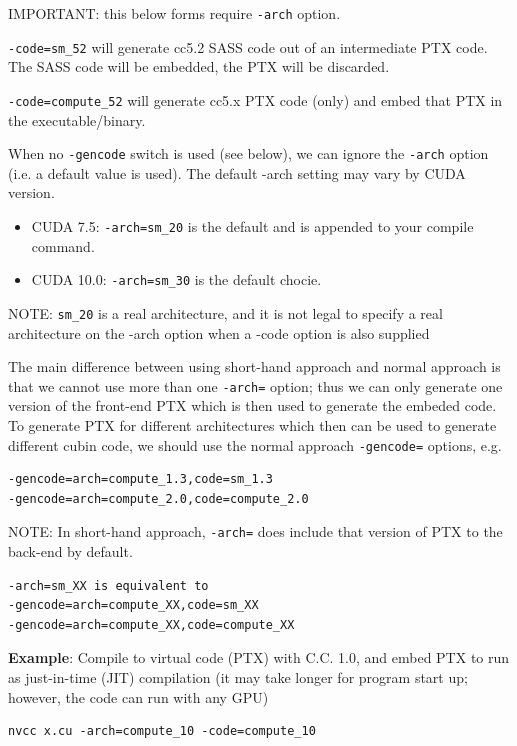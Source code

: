\begin{mdframed}
IMPORTANT: this below forms require \verb!-arch! option.

\verb!-code=sm_52! will generate cc5.2 SASS code out of an intermediate PTX
code. The SASS code will be embedded, the PTX will be discarded.

\verb!-code=compute_52! will generate cc5.x PTX code (only) and embed that PTX
in the executable/binary. 


When no \verb!-gencode! switch is used (see below), we can ignore the
\verb!-arch! option (i.e. a default value is used). The default -arch setting may
vary by CUDA version.
\begin{itemize}
  \item  CUDA 7.5: \verb!-arch=sm_20! is the default and is appended to your compile command.
   
   \item CUDA 10.0: \verb!-arch=sm_30! is the default chocie.
\end{itemize}

NOTE: \verb!sm_20! is a real architecture, and it is not legal to specify a real
architecture on the -arch option when a -code option is also supplied

\end{mdframed}

The main difference between using short-hand approach and normal approach is
that we cannot use more than one \verb!-arch=! option; thus we can only generate
one version of the front-end PTX which is then used to generate the embeded
code. To generate PTX for different architectures which then can be used to
generate different cubin code, we should use the normal approach
\verb!-gencode=! options, e.g.
\begin{verbatim}
-gencode=arch=compute_1.3,code=sm_1.3 
-gencode=arch=compute_2.0,code=compute_2.0
\end{verbatim}


NOTE: In short-hand approach, \verb!-arch=! does include that version of PTX
to the back-end by default.
\begin{verbatim}
-arch=sm_XX is equivalent to 
-gencode=arch=compute_XX,code=sm_XX 
-gencode=arch=compute_XX,code=compute_XX
\end{verbatim}



{\bf Example}: Compile to virtual code (PTX) with C.C. 1.0, and embed PTX to
 run as just-in-time (JIT) compilation (it may take longer for program start
up; however, the code can run with any GPU)
\begin{verbatim}
nvcc x.cu -arch=compute_10 -code=compute_10
\end{verbatim}

